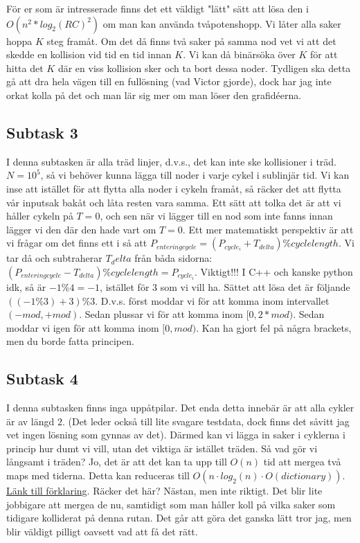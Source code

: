 \documentclass{article}
\begin{document}
\begin{enumerate}
\end{enumerate}

För er som är intresserade finns det ett väldigt "lätt" sätt att lösa den i $O(n^2*log_2(RC)^2)$ om man kan använda tvåpotenshopp. Vi låter alla saker hoppa $K$ steg framåt. Om det då finns två saker på samma nod vet vi att det skedde en kollision vid tid en tid innan $K$. Vi kan då binärsöka över $K$ för att hitta det $K$ där en viss kollision sker och ta bort dessa noder. Tydligen ska detta gå att dra hela vägen till en fullösning (vad Victor gjorde), dock har jag inte orkat kolla på det och man lär sig mer om man löser den grafidéerna.

\subsection*{Subtask 3}
I denna subtasken är alla träd linjer, d.v.s., det kan inte ske kollisioner i träd. $N=10^5$, så vi behöver kunna lägga till noder i varje cykel i sublinjär tid. Vi kan inse att istället för att flytta alla noder i cykeln framåt, så räcker det att flytta vår inputsak bakåt och låta resten vara samma. Ett sätt att tolka det är att vi håller cykeln på $T=0$, och sen när vi lägger till en nod som inte fanns innan lägger vi den där den hade vart om $T=0$. Ett mer matematiskt perspektiv är att vi frågar om det finns ett i så att $P_{enteringcycle}=(P_{cycle_i}+T_{delta})\%cyclelength$. Vi tar då och subtraherar $T_delta$ från båda sidorna: $(P_{enteringcycle}-T_{delta})\%cyclelength=P_{cycle_i}$. Viktigt!!! I C++ och kanske python idk, så är $-1\%4=-1$, istället för $3$ som vi vill ha. Sättet att lösa det är följande $((-1\%3)+3)\%3$. D.v.s. först moddar vi för att komma inom intervallet $(-mod,+mod)$. Sedan plussar vi för att komma inom $[0, 2*mod)$. Sedan moddar vi igen för att komma inom $[0, mod)$. Kan ha gjort fel på några brackets, men du borde fatta principen.

\subsection*{Subtask 4}
I denna subtasken finns inga uppåtpilar. Det enda detta innebär är att alla cykler är av längd $2$. (Det leder också till lite svagare testdata, dock finns det såvitt jag vet ingen lösning som gynnas av det). Därmed kan vi lägga in saker i cyklerna i princip hur dumt vi vill, utan det viktiga är istället träden. Så vad gör vi långsamt i träden? Jo, det är att det kan ta upp till $O(n)$ tid att mergea två maps med tiderna. Detta kan reduceras till $O(n\cdot log_2(n)\cdot O(dictionary))$. \href{https://usaco.guide/plat/merging?lang=cpp}{Länk till förklaring}. Räcker det här? Nästan, men inte riktigt. Det blir lite jobbigare att mergea de nu, samtidigt som man håller koll på vilka saker som tidigare kolliderat på denna rutan. Det går att göra det ganska lätt tror jag, men blir väldigt pilligt oavsett vad att få det rätt. 
\end{document}
